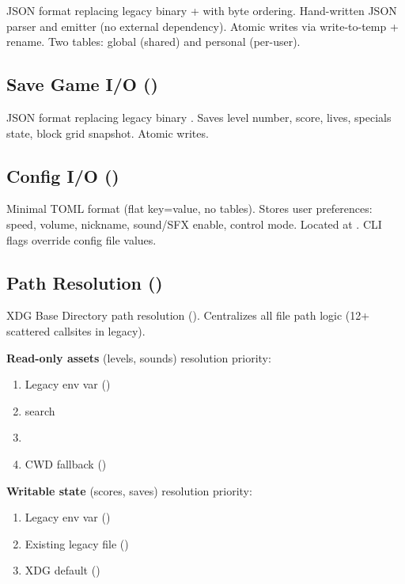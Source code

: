 \documentclass[11pt,a4paper]{article}
\begin{document}
JSON format replacing legacy binary  +  with  byte ordering. Hand-written JSON parser and emitter (no external dependency). Atomic writes via write-to-temp + rename. Two tables: global (shared) and personal (per-user).

\subsection{Save Game I/O ()}
\label{sec:savegame-io}

JSON format replacing legacy binary . Saves level number, score, lives, specials state, block grid snapshot. Atomic writes.

\subsection{Config I/O ()}
\label{sec:config-io}

Minimal TOML format (flat key=value, no tables). Stores user preferences: speed, volume, nickname, sound/SFX enable, control mode. Located at . CLI flags override config file values.

\subsection{Path Resolution ()}
\label{sec:paths}

XDG Base Directory path resolution (). Centralizes all file path logic (12+ scattered callsites in legacy).

\textbf{Read-only assets} (levels, sounds) resolution priority:
\begin{enumerate}[nosep]
    \item Legacy env var ()
    \item {} search
    \item {}
    \item CWD fallback ()
\end{enumerate}

\textbf{Writable state} (scores, saves) resolution priority:
\begin{enumerate}[nosep]
    \item Legacy env var ()
    \item Existing legacy file ()
    \item XDG default ()
\end{enumerate}
\end{document}

